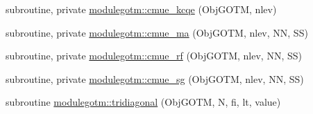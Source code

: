 \begin{DoxyCompactItemize}
\item 
subroutine, private \mbox{\hyperlink{namespacemodulegotm_ab365e1ebbb95df9750427f6340cac165}{modulegotm\+::cmue\+\_\+kcqe}} (Obj\+G\+O\+TM, nlev)
\item 
subroutine, private \mbox{\hyperlink{namespacemodulegotm_a35d3226a2d10d64e249360320b18c8a4}{modulegotm\+::cmue\+\_\+ma}} (Obj\+G\+O\+TM, nlev, NN, SS)
\item 
subroutine, private \mbox{\hyperlink{namespacemodulegotm_a9f8f0a6e92610182a87816932d096a5a}{modulegotm\+::cmue\+\_\+rf}} (Obj\+G\+O\+TM, nlev, NN, SS)
\item 
subroutine, private \mbox{\hyperlink{namespacemodulegotm_a532d05762eb6990a602d72c0cf825f66}{modulegotm\+::cmue\+\_\+sg}} (Obj\+G\+O\+TM, nlev, NN, SS)
\item 
subroutine \mbox{\hyperlink{namespacemodulegotm_a95c763a61ad96de7516848ea4a686fdb}{modulegotm\+::tridiagonal}} (Obj\+G\+O\+TM, N, fi, lt, value)
\end{DoxyCompactItemize}
